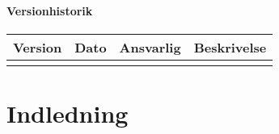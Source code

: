 \subsubsection{Versionhistorik}

\begin{longtabu} to 
    Version &    Dato &    Ansvarlig &    Beskrivelse\\[-1ex]
    \midrule
   
    	
\label{version_Systemark}
\end{longtabu}

\chapter{Indledning}



  
